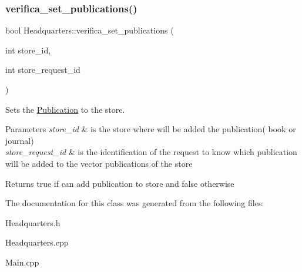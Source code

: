 \subsubsection{\texorpdfstring{verifica\+\_\+set\+\_\+publications()}{verifica\_set\_publications()}}
{\footnotesize\ttfamily bool Headquarters\+::verifica\+\_\+set\+\_\+publications (\begin{DoxyParamCaption}\item[{int}]{store\+\_\+id,  }\item[{int}]{store\+\_\+request\+\_\+id }\end{DoxyParamCaption})}



Sets the \hyperlink{class_publication}{Publication} to the store. 


\begin{DoxyParams}{Parameters}
{\em store\+\_\+id} & is the store where will be added the publication( book or journal) \\
\hline
{\em store\+\_\+request\+\_\+id} & is the identification of the request to know which publication will be added to the vector publications of the store\\
\hline
\end{DoxyParams}
\begin{DoxyReturn}{Returns}
true if can add publication to store and false otherwise 
\end{DoxyReturn}


The documentation for this class was generated from the following files\+:\begin{DoxyCompactItemize}
\item 
Headquarters.\+h\item 
Headquarters.\+cpp\item 
Main.\+cpp\end{DoxyCompactItemize}
